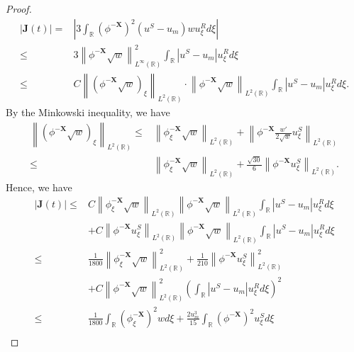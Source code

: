 \documentclass[10pt,reqno]{amsart}
\numberwithin{equation}{section}
\begin{document}
	\begin{proof}
		\begin{equation}
			\begin{aligned}
				\left|\mathbf{J}(t)\right|=&\left|3 \int_{\mathbb{R}} (\phi^{-\mathbf{X}})^2 (u^S - u_m) w u_\xi^R d\xi\right|\\
				\leq&3\left\lVert\phi^{-\mathbf{X}}\sqrt{w}\right\rVert_{L^{\infty}(\mathbb{R})}^2\int_{\mathbb{R}}\left|u^S-u_m\right|u_{\xi}^Rd\xi\\
				\leq&C\left\lVert\left(\phi^{-\mathbf{X}}\sqrt{w}\right)_{\xi}\right\rVert_{L^{2}(\mathbb{R})}\cdot\left\lVert\phi^{-\mathbf{X}}\sqrt{w}\right\rVert_{L^{2}(\mathbb{R})}\int_{\mathbb{R}}\left|u^S-u_m\right|u_{\xi}^Rd\xi.
			\end{aligned}
		\end{equation}
		By the Minkowski inequality, we have \begin{align*}
			\left\lVert\left(\phi^{-\mathbf{X}}\sqrt{w}\right)_{\xi}\right\rVert_{L^{2}(\mathbb{R})}
			\leq&\left\lVert\phi_{\xi}^{-\mathbf{X}}\sqrt{w}\right\rVert_{L^{2}(\mathbb{R})}+\left\lVert\phi^{-\mathbf{X}}\frac{w'}{2\sqrt{w}}u_{\xi}^S\right\rVert_{L^{2}(\mathbb{R})}\\
			\leq&\left\lVert\phi_{\xi}^{-\mathbf{X}}\sqrt{w}\right\rVert_{L^{2}(\mathbb{R})}+\frac{\sqrt{30}}{6}\left\lVert\phi^{-\mathbf{X}}u_{\xi}^S\right\rVert_{L^{2}(\mathbb{R})}.
		\end{align*}
		Hence, we have 
		\begin{equation}\label{J1}
			\begin{aligned}
				\left|\mathbf{J}(t)\right|\leq &C\left\lVert\phi_{\xi}^{-\mathbf{X}}\sqrt{w}\right\rVert_{L^{2}(\mathbb{R})}\left\lVert\phi^{-\mathbf{X}}\sqrt{w}\right\rVert_{L^{2}(\mathbb{R})}\int_{\mathbb{R}}\left|u^S-u_m\right|u_{\xi}^Rd\xi\\
				&+C\left\lVert\phi^{-\mathbf{X}}u_{\xi}^S\right\rVert_{L^{2}(\mathbb{R})}\left\lVert\phi^{-\mathbf{X}}\sqrt{w}\right\rVert_{L^{2}(\mathbb{R})}\int_{\mathbb{R}}\left|u^S-u_m\right|u_{\xi}^Rd\xi\\
				\leq&\frac{1}{1800}\left\lVert\phi_{\xi}^{-\mathbf{X}}\sqrt{w}\right\rVert_{L^{2}(\mathbb{R})}^2+\frac{1}{210}\left\lVert\phi^{-\mathbf{X}}u_{\xi}^S\right\rVert_{L^{2}(\mathbb{R})}^2\\
				&+C\left\lVert\phi^{-\mathbf{X}}\sqrt{w}\right\rVert_{L^{2}(\mathbb{R})}^2\left(\int_{\mathbb{R}}\left|u^S-u_m\right|u_{\xi}^Rd\xi\right)^2\\
				\leq&\frac{1}{1800}\int_{\mathbb{R}}(\phi_{\xi}^{-\mathbf{X}})^2wd\xi+\frac{2u_m^3}{15}\int_{\mathbb{R}}(\phi^{-\mathbf{X}})^2u_{\xi}^Sd\xi\\

\end{aligned}
\end{equation}
\end{proof}
\end{document}
